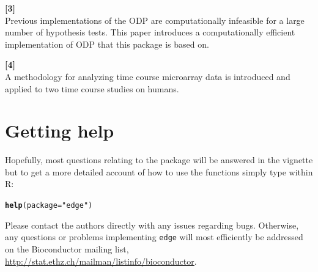 \documentclass{article}\usepackage[]{graphicx}\usepackage[]{color}
\makeatletter
\newcommand{\hlstr}[1]{\textcolor[rgb]{0.192,0.494,0.8}{#1}}%
\newcommand{\hlstd}[1]{\textcolor[rgb]{0.345,0.345,0.345}{#1}}%
\newcommand{\hlkwc}[1]{\textcolor[rgb]{0.333,0.667,0.333}{#1}}%
\newcommand{\hlkwd}[1]{\textcolor[rgb]{0.737,0.353,0.396}{\textbf{#1}}}%
\newenvironment{kframe}{%
 \def\at@end@of@kframe{}%
 \ifinner\ifhmode%
  \def\at@end@of@kframe{\end{minipage}}%
  \begin{minipage}{\columnwidth}%
 \fi\fi%
 \def\FrameCommand##1{\hskip\@totalleftmargin \hskip-\fboxsep
 \colorbox{shadecolor}{##1}\hskip-\fboxsep
     \hskip-\linewidth \hskip-\@totalleftmargin \hskip\columnwidth}%
 \MakeFramed {\advance\hsize-\width
   \@totalleftmargin\z@ \linewidth\hsize
   \@setminipage}}%
 {\par\unskip\endMakeFramed%
 \at@end@of@kframe}
\newenvironment{knitrout}{}{} %
\makeatother
\begin{document}
\textbf{[3] } \\
Previous implementations of the ODP are computationally infeasible for a large number of hypothesis tests. This paper introduces a computationally efficient implementation of ODP that this package is based on.

\textbf{[4] } \\
A methodology for analyzing time course microarray data is introduced and applied to two time course studies on humans. 

\section{Getting help}
Hopefully, most questions relating to the package will be answered in the vignette but to get a more detailed account of how to use the functions simply type within R:
\begin{knitrout}
\color{fgcolor}\begin{kframe}
\begin{alltt}
\hlkwd{help}\hlstd{(}\hlkwc{package} \hlstd{=} \hlstr{"edge"}\hlstd{)}
\end{alltt}
\end{kframe}
\end{knitrout}
\noindent Please contact the authors directly with any issues regarding bugs. Otherwise, any questions or problems implementing {\tt edge} will most efficiently be addressed on the Bioconductor mailing list, \url{http://stat.ethz.ch/mailman/listinfo/bioconductor}.
\end{document}
